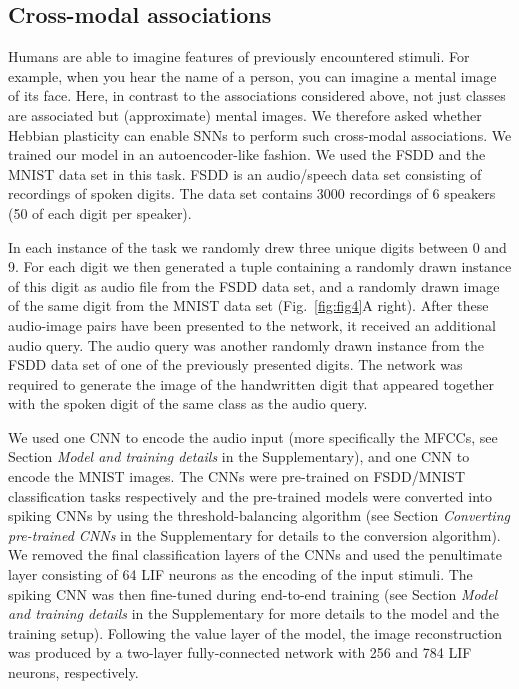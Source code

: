 \documentclass{article}
\begin{document}
\subsection{Cross-modal associations}
\label{sec:results-audio_image}
Humans are able to imagine features of previously encountered stimuli. For example, when you hear the name of a person, you can imagine a mental image of its face. Here, in contrast to the associations considered above, not just classes are associated but (approximate) mental images. We therefore asked whether Hebbian plasticity can enable SNNs to perform such cross-modal associations. We trained our model in an autoencoder-like fashion. We used the FSDD \cite{fsd2016} and the MNIST \cite{lecun2010mnist} data set in this task. FSDD is an audio/speech data set consisting of recordings of spoken digits. The data set contains \num{3000} recordings of \num{6} speakers (\num{50} of each digit per speaker).

In each instance of the task we randomly drew three unique digits between \num{0} and \num{9}. For each digit we then generated a tuple containing a randomly drawn instance of this digit as audio file from the FSDD data set, and a randomly drawn image of the same digit from the MNIST data set (Fig.~\ref{fig:fig4}A right). After these audio-image pairs have been presented to the network, it received an additional audio query. The audio query was another randomly drawn instance from the FSDD data set of one of the previously presented digits. The network was required to generate the image of the handwritten digit that appeared together with the spoken digit of the same class as the audio query.

We used one \gls{CNN} to encode the audio input (more specifically the \glspl{MFCC}, see Section \emph{Model and training details} in the Supplementary), and one \gls{CNN} to encode the MNIST images. The \glspl{CNN} were pre-trained on FSDD/MNIST classification tasks respectively and the pre-trained models were converted into spiking \glspl{CNN} by using the threshold-balancing algorithm \cite{diehl2015fast,sengupta2019going} (see Section \emph{Converting pre-trained CNNs} in the Supplementary for details to the conversion algorithm). We removed the final classification layers of the \glspl{CNN} and used the penultimate layer consisting of \num{64} \gls{LIF} neurons as the encoding of the input stimuli. The spiking \gls{CNN} was then fine-tuned during end-to-end training (see Section \emph{Model and training details} in the Supplementary for more details to the model and the training setup). Following the value layer of the model, the image reconstruction was produced by a two-layer fully-connected network with \num{256} and \num{784} \gls{LIF} neurons, respectively.
\end{document}
